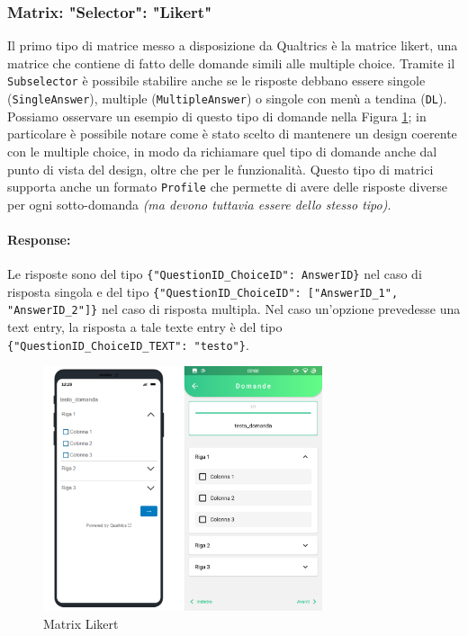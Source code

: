 \subsubsection{Matrix: "Selector": "Likert"}
Il primo tipo di matrice messo a disposizione da Qualtrics è la matrice likert, una matrice che contiene di fatto delle domande simili alle multiple choice. Tramite il \texttt{Subselector} è possibile stabilire anche se le risposte debbano essere singole (\texttt{SingleAnswer}), multiple (\texttt{MultipleAnswer}) o singole con menù a tendina (\texttt{DL}). Possiamo osservare un esempio di questo tipo di domande nella Figura \ref{fig:matrix_likert}; in particolare è possibile notare come è stato scelto di mantenere un design coerente con le multiple choice, in modo da richiamare quel tipo di domande anche dal punto di vista del design, oltre che per le funzionalità. Questo tipo di matrici supporta anche un formato \texttt{Profile} che permette di avere delle risposte diverse per ogni sotto-domanda \textit{(ma devono tuttavia essere dello stesso tipo)}.

\paragraph{Response:}
Le risposte sono del tipo \texttt{\{"QuestionID\_ChoiceID": AnswerID\}} nel caso di risposta singola e del tipo \texttt{\{"QuestionID\_ChoiceID": ["AnswerID\_1", "AnswerID\_2"]\}} nel caso di risposta multipla. Nel caso un'opzione prevedesse una text entry, la risposta a tale texte entry è del tipo \texttt{\{"QuestionID\_ChoiceID\_TEXT": "testo"\}}.

\begin{figure}[h!]
\centering
\includegraphics[width=0.73\textwidth]{img/matrix_likert}
\caption{Matrix Likert}
\label{fig:matrix_likert}
\end{figure}

